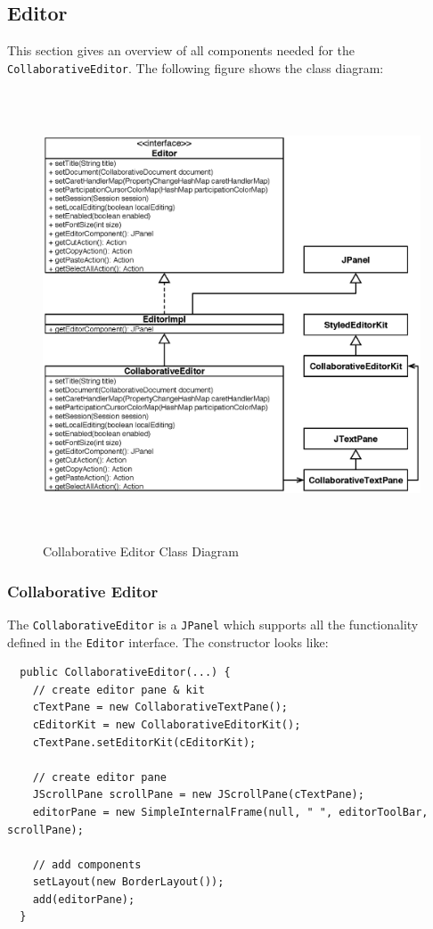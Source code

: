 \subsection{Editor}
This section gives an overview of all components needed for the \texttt{Collaborative\-Editor}. The following figure shows the class diagram:
\begin{figure}[H]
\begin{center}
  \includegraphics[height=5.25in, width=5.55in]{../images/finalreport/application_editor.eps}
\caption{Collaborative Editor Class Diagram}
\label{application_editor}
\end{center}
\end{figure}

\subsubsection{Collaborative Editor}
The \texttt{Collaborative\-Editor} is a \texttt{JPanel} which supports all the functionality defined in the \texttt{Editor} interface. The constructor looks like:
\begin{verbatim}
  public CollaborativeEditor(...) {
    // create editor pane & kit
    cTextPane = new CollaborativeTextPane();
    cEditorKit = new CollaborativeEditorKit();
    cTextPane.setEditorKit(cEditorKit);

    // create editor pane
    JScrollPane scrollPane = new JScrollPane(cTextPane);
    editorPane = new SimpleInternalFrame(null, " ", editorToolBar, scrollPane);

    // add components		
    setLayout(new BorderLayout());
    add(editorPane);    
  }
\end{verbatim}

